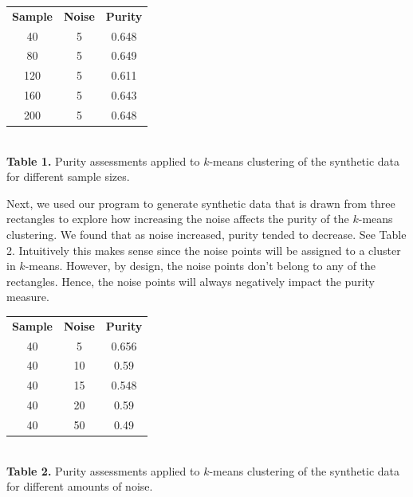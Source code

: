 \documentclass[psamsfonts,onesided,10pt]{amsart}
\begin{document}
\vspace{1ex}
\begin{center}
\begin{tabular}{ |c|c|c| } 
 \hline
\textbf{Sample} & \textbf{Noise} & \textbf{Purity}\\ 
40 & 5 & 0.648 \\ 
80 & 5 & 0.649 \\ 
120 & 5 & 0.611 \\ 
160 & 5 & 0.643 \\ 
200 & 5 & 0.648 \\ 
 \hline
\end{tabular}\\
\textbf{Table 1.} Purity assessments applied to $k$-means clustering of the synthetic data for 
different sample sizes.
\end{center}
\vspace{1ex}

Next, we used our program to generate synthetic data that is drawn from three rectangles to 
explore how increasing the noise affects the purity of the $k$-means clustering. We found that 
as noise increased, purity tended to decrease. See Table 2. Intuitively this makes sense since the 
noise points will be assigned to a cluster in $k$-means. However, by design, the noise points 
don't belong to any of the rectangles. Hence, the noise points will always negatively impact the purity measure. 

\vspace{1ex}
\begin{center}
\begin{tabular}{ |c|c|c| } 
 \hline
\textbf{Sample} & \textbf{Noise} & \textbf{Purity}\\ 
40 & 5 & 0.656 \\ 
40 & 10 & 0.59 \\ 
40 & 15 & 0.548 \\ 
40 & 20 & 0.59 \\ 
40 & 50 & 0.49 \\ 
 \hline
\end{tabular}\\
\textbf{Table 2.} Purity assessments applied to $k$-means clustering of the synthetic data for 
different amounts of noise.
\end{center}
\vspace{1ex}
\end{document}
